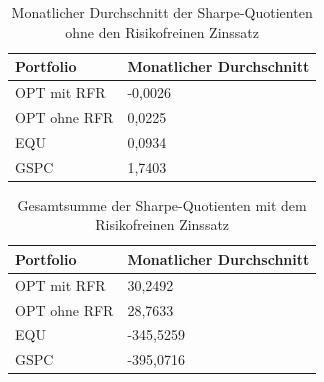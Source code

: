 \documentclass[12pt]{article}
\begin{document}
        \begin{table}[htp]
            \begin{center}
                
                \begin{tabular}{ | l | l | }

                    \hline
                    \textbf{Portfolio}   & \textbf{Monatlicher Durchschnitt} \\
                    \hline
                    OPT mit RFR          & -0,0026 \\      
                    OPT ohne RFR         & 0,0225 \\
                    EQU                  & 0,0934 \\            
                    GSPC                 & 1,7403 \\     
                            
                    \hline

                \end{tabular}
                \caption{Monatlicher Durchschnitt der Sharpe-Quotienten ohne den Risikofreinen Zinssatz}
                \label{md-sq-ohne-rfz}

            \end{center}
        \end{table}


        \begin{table}[htp]
            \begin{center}
                
                \begin{tabular}{ | l | l | }

                    \hline
                    \textbf{Portfolio}   & \textbf{Monatlicher Durchschnitt} \\
                    \hline
                    OPT mit RFR          & 30,2492  \\          
                    OPT ohne RFR         & 28,7633 \\
                    EQU                  & -345,5259  \\              
                    GSPC                 & -395,0716  \\       
                            
                    \hline

                \end{tabular}
                \caption{Gesamtsumme der Sharpe-Quotienten mit dem Risikofreinen Zinssatz}
                \label{gs-sq-mit-rfz}

            \end{center}
        \end{table}
\end{document}
